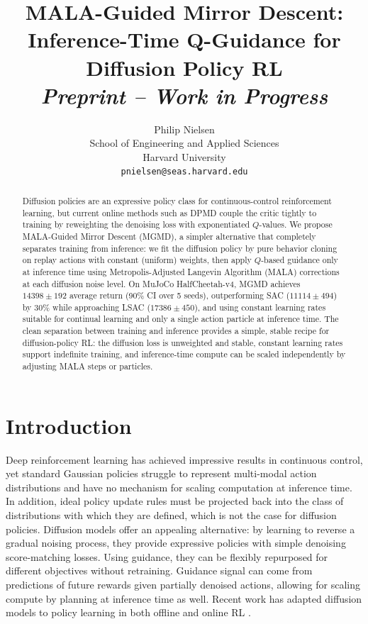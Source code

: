 \documentclass{article}
\title{MALA-Guided Mirror Descent:\\Inference-Time Q-Guidance for Diffusion Policy RL\\[0.5em]\normalsize\textit{Preprint -- Work in Progress}}
\author{%
  Philip Nielsen \\
  School of Engineering and Applied Sciences\\
  Harvard University\\
  \texttt{pnielsen@seas.harvard.edu} \\
}
\theoremstyle{plain}
\theoremstyle{definition}
\theoremstyle{remark}
\begin{document}
\maketitle

\begin{abstract}
Diffusion policies are an expressive policy class for continuous-control reinforcement learning, but current online methods such as DPMD couple the critic tightly to training by reweighting the denoising loss with exponentiated $Q$-values.
We propose MALA-Guided Mirror Descent (MGMD), a simpler alternative that completely separates training from inference: we fit the diffusion policy by pure behavior cloning on replay actions with constant (uniform) weights, then apply $Q$-based guidance only at inference time using Metropolis-Adjusted Langevin Algorithm (MALA) corrections at each diffusion noise level.
On MuJoCo HalfCheetah-v4, MGMD achieves $14398 \pm 192$ average return (90\% CI over 5 seeds), outperforming SAC ($11114 \pm 494$) by 30\% while approaching LSAC ($17386 \pm 450$), and using constant learning rates suitable for continual learning and only a single action particle at inference time.
The clean separation between training and inference provides a simple, stable recipe for diffusion-policy RL: the diffusion loss is unweighted and stable, constant learning rates support indefinite training, and inference-time compute can be scaled independently by adjusting MALA steps or particles.
\end{abstract}

\section{Introduction}
\label{sec:intro}

Deep reinforcement learning has achieved impressive results in continuous control, yet standard Gaussian policies struggle to represent multi-modal action distributions and have no mechanism for scaling computation at inference time. In addition, ideal policy update rules must be projected back into the class of distributions with which they are defined, which is not the case for diffusion policies.
Diffusion models \citep{ho2020denoising,song2021sde} offer an appealing alternative: by learning to reverse a gradual noising process, they provide expressive policies with simple denoising score-matching losses. Using guidance, they can be flexibly repurposed for different objectives without retraining. Guidance signal can come from predictions of future rewards given partially denoised actions, allowing for scaling compute by planning at inference time as well.
Recent work has adapted diffusion models to policy learning in both offline and online RL \citep{janner2022diffuser,wang2023diffusion,ma2025soft}.
\end{document}
